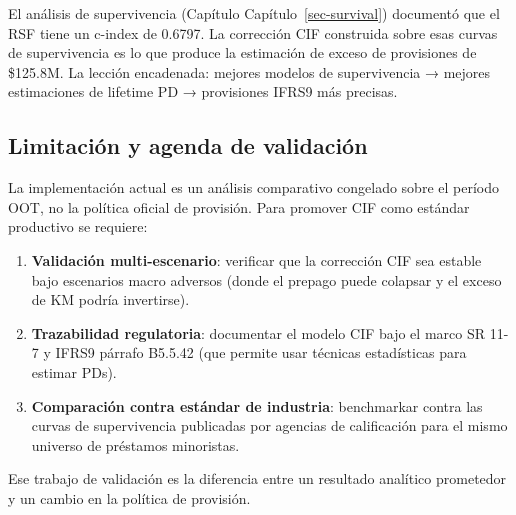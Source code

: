 \documentclass[
  spanish,
  11pt,
  letterpaper,
]{scrbook}
\providecommand{\tightlist}{%
  \setlength{\itemsep}{0pt}\setlength{\parskip}{0pt}}
\theoremstyle{plain}
\theoremstyle{remark}
\begin{document}
\begin{tcolorbox}[enhanced jigsaw, arc=.35mm, bottomrule=.15mm, bottomtitle=1mm, breakable, colback=white, colbacktitle=quarto-callout-note-color!10!white, colframe=quarto-callout-note-color-frame, coltitle=black, left=2mm, leftrule=.75mm, opacityback=0, opacitybacktitle=0.6, rightrule=.15mm, title=\textcolor{quarto-callout-note-color}{\faInfo}\hspace{0.5em}{Resultado del capítulo de supervivencia}, titlerule=0mm, toprule=.15mm, toptitle=1mm]

El análisis de supervivencia (Capítulo Capítulo~\ref{sec-survival})
documentó que el RSF tiene un c-index de 0.6797. La corrección CIF
construida sobre esas curvas de supervivencia es lo que produce la
estimación de exceso de provisiones de \$125.8M. La lección encadenada:
mejores modelos de supervivencia → mejores estimaciones de lifetime PD →
provisiones IFRS9 más precisas.

\end{tcolorbox}

\subsection{Limitación y agenda de
validación}\label{limitaciuxf3n-y-agenda-de-validaciuxf3n}

La implementación actual es un análisis comparativo congelado sobre el
período OOT, no la política oficial de provisión. Para promover CIF como
estándar productivo se requiere:

\begin{enumerate}
\def\labelenumi{\arabic{enumi}.}
\tightlist
\item
  \textbf{Validación multi-escenario}: verificar que la corrección CIF
  sea estable bajo escenarios macro adversos (donde el prepago puede
  colapsar y el exceso de KM podría invertirse).
\item
  \textbf{Trazabilidad regulatoria}: documentar el modelo CIF bajo el
  marco SR 11-7 y IFRS9 párrafo B5.5.42 (que permite usar técnicas
  estadísticas para estimar PDs).
\item
  \textbf{Comparación contra estándar de industria}: benchmarkar contra
  las curvas de supervivencia publicadas por agencias de calificación
  para el mismo universo de préstamos minoristas.
\end{enumerate}

Ese trabajo de validación es la diferencia entre un resultado analítico
prometedor y un cambio en la política de provisión.
\end{document}
